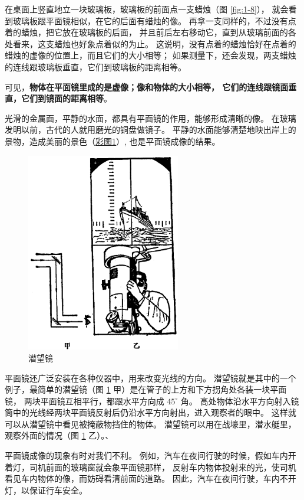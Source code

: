 在桌面上竖直地立一块玻璃板，玻璃板的前面点一支蜡烛（图 \ref{fig:1-8}），
就会看到玻璃板跟平面镜相似，在它的后面有蜡烛的像。
再拿一支同样的，不过没有点着的蜡烛，把它放在玻璃板的后面，
并且前后左右移动它，直到从玻璃前面的各处看来，这支蜡烛也好象点着似的为止。
这说明，没有点着的蜡烛恰好在点着的蜡烛的虚像的位置上，而且它们的大小相等；
如果测量下，还会发现，两支蜡烛的连线跟玻璃板垂直，它们到玻璃板的距离相等。

可见，\textbf{物体在平面镜里成的是虚像；像和物体的大小相等，
它们的连线跟镜面垂直，它们到镜面的距离相等}。

光滑的金属面，平静的水面，都具有平面镜的作用，能够形成清晰的像。
在玻璃发明以前，古代的人就用磨光的铜盘做镜子。
平静的水面能够清楚地映出岸上的景物，造成美丽的景色（\hyperref[fig:pic1]{彩图1}）, 也是平面镜成像的结果。

\begin{figure}[htbp]
    \centering
    \includegraphics[width=0.6\textwidth]{../pic/czwl2-ch1-9}
    \caption{潜望镜}\label{fig:1-9}
\end{figure}

平面镜还广泛安装在各种仪器中，用来改变光线的方向。
潜望镜就是其中的一个例子，最简单的潜望镜（图 \ref{fig:1-9} 甲）是在管子的上方和下方拐角处各装一块平面镜，
两块平面镜互相平行，都跟水平方向成 $45^\circ$ 角。
高处物体沿水平方向射入镜筒中的光线经两块平面镜反射后仍沿水平方向射出，进入观察者的眼中。
这样就可以从潜望镜中看见被掩蔽物挡住的物体。
潜望镜可以用在战壕里，潜水艇里，观察外面的情况（图 \ref{fig:1-9} 乙）。、

平面镜成像的现象有时对我们不利。
例如，汽车在夜间行驶的时候，假如车内开着灯，司机前面的玻璃窗就会象平面镜那样，
反射车内物体投射来的光，使司机看见车内物体的像，而妨碍看清前面的道路。
因此，汽车在夜间行驶，车内不开灯，以保证行车安全。

